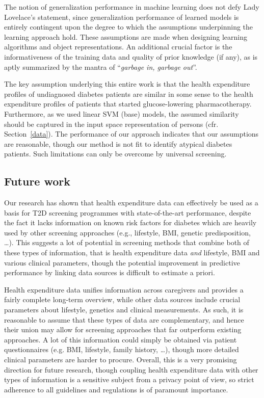 The notion of generalization performance in machine learning does not defy Lady Lovelace's statement, since generalization performance of learned models is entirely contingent upon the degree to which the assumptions underpinning the learning approach hold. These assumptions are made when designing learning algorithms and object representations. An additional crucial factor is the informativeness of the training data and quality of prior knowledge (if any), as is aptly summarized by the mantra of ``\emph{garbage in, garbage out}''.%

The key assumption underlying this entire work is that the health expenditure profiles of undiagnosed diabetes patients are similar in some sense to the health expenditure profiles of patients that started glucose-lowering pharmacotherapy. Furthermore, as we used linear SVM (base) models, the assumed similarity should be captured in the input space representation of persons (cfr. Section~\ref{data}). The performance of our approach indicates that our assumptions are reasonable, though our method is not fit to identify atypical diabetes patients. Such limitations can only be overcome by universal screening.

\subsection{Future work} 

Our research has shown that health expenditure data can effectively be used as a basis for T2D screening programmes with state-of-the-art performance, despite the fact it lacks information on known risk factors for diabetes which are heavily used by other screening approaches (e.g., lifestyle, BMI, genetic predisposition, \ldots). This suggests a lot of potential in screening methods that combine both of these types of information, that is health expenditure data \emph{and} lifestyle, BMI and various clinical parameters, though the potential improvement in predictive performance by linking data sources is difficult to estimate a priori. 

Health expenditure data unifies information across caregivers and provides a fairly complete long-term overview, while other data sources include crucial parameters about lifestyle, genetics and clinical measurements. As such, it is reasonable to assume that these types of data are complementary, and hence their union may allow for screening approaches that far outperform existing approaches. A lot of this information could simply be obtained via patient questionnaires (e.g. BMI, lifestyle, family history, \ldots), though more detailed clinical parameters are harder to procure. Overall, this is a very promising direction for future research, though coupling health expenditure data with other types of information is a sensitive subject from a privacy point of view, so strict adherence to all guidelines and regulations is of paramount importance. 

